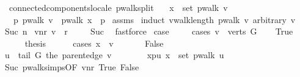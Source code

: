 \begin{isabellebody}
{\isafoldproof}%
%
\isadelimproof
\isanewline
%
\endisadelimproof
\isanewline
{}\isamarkupfalse%
\ {\isacharparenleft}\ connected{\isacharunderscore}components{\isacharunderscore}locale{\isacharparenright}\ pwalk{\isacharunderscore}split{\isacharcolon}\isanewline
\ \ \ {\isachardoublequoteopen}x\ {\isasymin}\ set\ {\isacharparenleft}pwalk\ v{\isacharparenright}{\isachardoublequoteclose}\isanewline
\ \ \ {\isachardoublequoteopen}{\isasymexists}p{\isachardot}\ pwalk\ v\ {\isacharequal}\ pwalk\ x\ {\isacharat}\ p{\isachardoublequoteclose}\isanewline
%
\isadelimproof
%
\endisadelimproof
%
\isatagproof
{}\isamarkupfalse%
\ assms\isanewline
{}\isamarkupfalse%
\ {\isacharparenleft}induct\ {\isachardoublequoteopen}vwalk{\isacharunderscore}length\ {\isacharparenleft}pwalk\ v{\isacharparenright}{\isachardoublequoteclose}\ arbitrary{\isacharcolon}\ v{\isacharparenright}\isanewline
{}\isamarkupfalse%
\ {\isacharparenleft}Suc\ n{\isacharparenright}\isanewline
{}\isamarkupfalse%
\ vnr{\isacharcolon}\ {\isachardoublequoteopen}v\ {\isasymnoteq}\ r{\isachardoublequoteclose}\ \isanewline
\ \ \isamarkupfalse%
\ Suc{\isacharparenleft}{}{\isacharparenright}\ \isamarkupfalse%
\ fastforce\isanewline
{}\isamarkupfalse%
\ {\isacharquery}case\ \isanewline
\ \ \isamarkupfalse%
\ {\isacharparenleft}cases\ {\isachardoublequoteopen}v\ {\isasymin}\ verts\ G{\isachardoublequoteclose}{\isacharparenright}\isanewline
\ \ \isamarkupfalse%
\ True\isanewline
\ \ \ \ \isamarkupfalse%
\ {\isacharquery}thesis\isanewline
\ \ \ \ \isamarkupfalse%
\ {\isacharparenleft}cases\ {\isachardoublequoteopen}x\ {\isacharequal}\ v{\isachardoublequoteclose}{\isacharparenright}\ \isanewline
\ \ \ \ \isamarkupfalse%
\ False\ \isanewline
\ \ \ \ \ \ \isamarkupfalse%
\ {\isacharquery}u\ {\isacharequal}\ {\isachardoublequoteopen}tail\ G\ {\isacharparenleft}the\ {\isacharparenleft}parent{\isacharunderscore}edge\ v{\isacharparenright}{\isacharparenright}{\isachardoublequoteclose}\isanewline
\ \ \ \ \ \ \isamarkupfalse%
\ xpu{\isacharcolon}\ {\isachardoublequoteopen}x\ {\isasymin}\ set\ {\isacharparenleft}pwalk\ {\isacharquery}u{\isacharparenright}{\isachardoublequoteclose}\isanewline
\ \ \ \ \ \ \ \ \isamarkupfalse%
\ Suc{\isacharparenleft}{}{\isacharparenright}\ pwalk{\isacharunderscore}simps{\isacharparenleft}{}{\isacharparenright}{\isacharbrackleft}OF\ vnr\ True{\isacharbrackright}\ False\ \isamarkupfalse%

\end{isabellebody}
